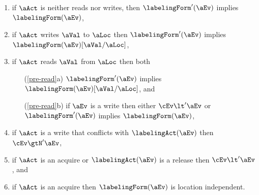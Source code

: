\begin{definition}
\begin{enumerate}
\item\label{pre-nowrite} if $\aAct$ is neither reads nor writes, then $\labelingForm'(\aEv)$
  implies $\labelingForm(\aEv)$,
\item\label{pre-write} if $\aAct$ writes $\aVal$ to $\aLoc$ then
  $\labelingForm'(\aEv)$ implies $\labelingForm(\aEv)[\aVal/\aLoc]$,
\item\label{pre-read} if $\aAct$ reads $\aVal$ from $\aLoc$ then both
  \begin{enumerate}
  \item[(\ref{pre-read}a)] $\labelingForm'(\aEv)$ implies $\labelingForm(\aEv)[\aVal/\aLoc]$, and
  \item[(\ref{pre-read}b)] if $\aEv$ is a write then either $\cEv\lt'\aEv$
    or $\labelingForm'(\aEv)$ implies $\labelingForm(\aEv)$,
  \end{enumerate}
\item\label{pre-coherence} if $\aAct$ is a write that conflicts with $\labelingAct(\aEv)$ 
    then $\cEv \gtN' \aEv$,
\item\label{pre-sync} if $\aAct$ is an acquire or $\labelingAct(\aEv)$ is a release then $\cEv \lt' \aEv$, and
\item\label{pre-acquire} if $\aAct$ is an acquire then $\labelingForm(\aEv)$ is location independent.

\end{enumerate}
\end{definition}

